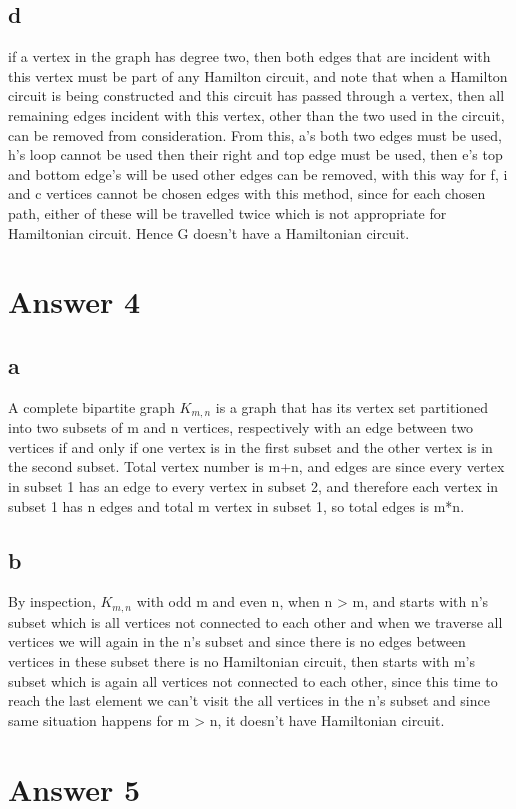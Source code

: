 \documentclass[11pt]{article}
\begin{document}
\subsection*{d}
if a vertex in the graph has degree two, then both edges that are incident with this vertex must be part of any Hamilton circuit, and note that when a Hamilton circuit is being constructed and this circuit has passed through a vertex, then all remaining edges incident with this vertex, other than the two used in the circuit, can be removed from consideration. From this, a's both two edges must be used, h's loop cannot be used then their right and top edge must be used, then e's top and bottom edge's will be used other edges can be removed, with this way for f, i and c vertices cannot be chosen edges with this method, since for each chosen path, either of these will be travelled twice which is not appropriate for Hamiltonian circuit. Hence G doesn't have a Hamiltonian circuit.
\section*{Answer 4}
\subsection*{a}
A complete bipartite graph $K_{m,n}$ is a graph that has its vertex set partitioned into two subsets of m and n vertices, respectively with an edge between two vertices if and only if one vertex is in the first subset and the other vertex is in the second subset. Total vertex number is m+n, and edges are since every vertex in subset 1 has an edge to every vertex in subset 2, and therefore each vertex in subset 1 has n edges and total m vertex in subset 1, so total edges is m*n.
\subsection*{b}
By inspection, $K_{m,n}$ with odd m and even n, when n > m, and starts with n's subset which is all vertices not connected to each other and when we traverse all vertices we will again in the n's subset and since there is no edges between vertices in these subset there is no Hamiltonian circuit, then starts with m's subset which is again all vertices not connected to each other, since this time to reach the last element we can't visit the all vertices in the n's subset and since same situation happens for m > n, it doesn't have Hamiltonian circuit.
\section*{Answer 5}
\end{document}
